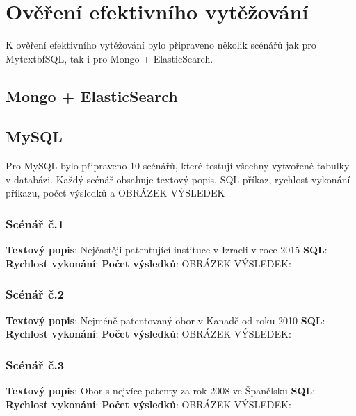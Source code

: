 \chapter{Ověření efektivního vytěžování}
K ověření efektivního vytěžování bylo připraveno několik scénářů jak pro Mytextbf{SQL}, tak i pro Mongo + ElasticSearch.
\section{Mongo + ElasticSearch}
\section{MySQL}
Pro MySQL bylo připraveno 10 scénářů, které testují všechny vytvořené tabulky v databázi. Každý scénář obsahuje textový popis, SQL příkaz, rychlost vykonání příkazu, počet výsledků a OBRÁZEK VÝSLEDEK

\subsection{Scénář č.1}
\textbf{Textový popis}: Nejčastěji patentující instituce v Izraeli v roce 2015
\newline
\textbf{SQL}: 
\newline
\textbf{Rychlost vykonání}: 
\newline
\textbf{Počet výsledků}:
\newline
OBRÁZEK VÝSLEDEK:


\subsection{Scénář č.2}
\textbf{Textový popis}: Nejméně patentovaný obor v Kanadě od roku 2010
\newline
\textbf{SQL}: 
\newline
\textbf{Rychlost vykonání}: 
\newline
\textbf{Počet výsledků}:
\newline
OBRÁZEK VÝSLEDEK:

\subsection{Scénář č.3}
\textbf{Textový popis}: Obor s nejvíce patenty za rok 2008 ve Španělsku
\newline
\textbf{SQL}: 
\newline
\textbf{Rychlost vykonání}: 
\newline
\textbf{Počet výsledků}:
\newline
OBRÁZEK VÝSLEDEK:

